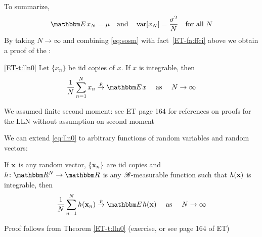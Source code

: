 \begin{frame}

    \vspace{2em}
    To summarize,
    \begin{equation}
        \label{eq:sosm}
        \EE \bar x_N = \mu 
        \quad \text{and} \quad
        \var[ \bar x_N ] = \frac{\sigma^2}{N}
        \quad \text{for all } N
    \end{equation}
    By taking $N \to
    \infty$ and combining \eqref{eq:sosm} with fact~\ref{ET-fa:ffci} above we obtain a proof of 
    the :

    \vspace{1em}
    \Thm
        \eqref{ET-t:lln0}
        Let $\{x_n\}$ be {\sc iid} copies of $x$.  If $x$ is integrable, then
        \begin{equation}
            \label{eq:lln0}
            \frac{1}{N} \sum_{n=1}^N x_n \toprob \EE x 
             \quad \text{ as } \quad N \to \infty
        \end{equation}
    
    
    We assumed finite second moment: see ET page 164 for references on proofs for the LLN without assumption on second moment

\end{frame}

\begin{frame}

    \vspace{2em}
    We can extend \eqref{eq:lln0} to 
    arbitrary functions of random variables and random vectors:
    
    \vspace{1em}
    If
    ${\mathbf x}$ is any random vector, $\{{\mathbf x}_n\}$ are {\sc iid} copies and
    $h \colon \RR^N \to \RR$ is any $\mathscr B$-measurable function such that
    $h({\mathbf x})$ is integrable, then
    \begin{equation*}
        \label{eq:lln0g}
        \frac{1}{N} \sum_{n=1}^N h(\boldx_n) \toprob \EE  h(\boldx) 
             \quad \text{ as } \quad N \to \infty
    \end{equation*}
    
    Proof follows from Theorem \eqref{ET-t:lln0} (exercise, or see page 164 of ET)
    
\end{frame}

